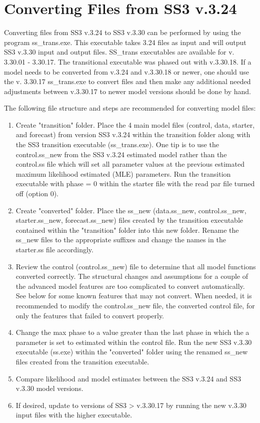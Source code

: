 \hypertarget{ConvIssues}{}
\section{Converting Files from SS3 v.3.24}
Converting files from SS3 v.3.24 to SS3 v.3.30 can be performed by using the program ss\_trans.exe. This executable takes 3.24 files as input and will output SS3 v.3.30 input and output files. SS\_trans executables are available for v. 3.30.01 - 3.30.17. The transitional executable was phased out with v.3.30.18. If a model needs to be converted from v.3.24 and v.3.30.18 or newer, one should use the v. 3.30.17 ss\_trans.exe to convert files and then make any additional needed adjustments between v.3.30.17 to newer model versions should be done by hand.  

The following file structure and steps are recommended for converting model files:
\begin{enumerate}
	\item Create "transition" folder.  Place the 4 main model files (control, data, starter, and forecast) from version SS3 v.3.24 within the transition folder along with the SS3 transition executable (ss\_trans.exe).  One tip is to use the control.ss\_new from the SS3 v.3.24 estimated model rather than the control.ss file which will set all parameter values at the previous estimated maximum likelihood estimated (MLE) parameters.  Run the transition executable with phase = 0 within the starter file with the read par file turned off (option 0).
	
	\item Create "converted" folder.  Place the ss\_new (data.ss\_new, control.ss\_new, starter.ss\_new, forecast.ss\_new) files created by the transition executable contained within the "transition" folder into this new folder.  Rename the ss\_new files to the appropriate suffixes and change the names in the starter.ss file accordingly.
	
	\item Review the control (control.ss\_new) file to determine that all model functions converted correctly.  The structural changes and assumptions for a couple of the advanced model features are too complicated to convert automatically.  See below for some known features that may not convert. When needed, it is recommended to modify the control.ss\_new file, the converted control file, for only the features that failed to convert properly.
	
	\item Change the max phase to a value greater than the last phase in which the a parameter is set to estimated within the control file.  Run the new SS3 v.3.30 executable (ss.exe) within the "converted" folder using the renamed ss\_new files created from the transition executable.
	
	\item Compare likelihood and model estimates between the SS3 v.3.24 and SS3 v.3.30 model versions.
	
	\item If desired, update to versions of SS3 > v.3.30.17 by running the new v.3.30 input files with the higher executable.
\end{enumerate}

